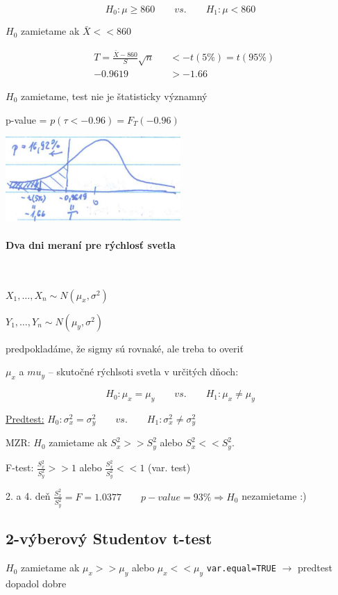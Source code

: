 \documentclass[unknownkeysallowed]{article}
\begin{document}
$$H_0: \mu \geq 860 \qquad vs. \qquad H_1:  \mu < 860$$

\begin{multicols}{2}
$H_0$ zamietame ak $\bar{X} << 860$

\begin{align*}
&T = \frac{\bar{X}-860}{S}\sqrt{n} &&< -t(5\%) = t(95\%)\\
&-0.9619 &&> -1.66
\end{align*}

$H_0$ zamietame, test nie je štatisticky významný

p-value = $p(\tau < -0.96) = F_T(-0.96)$

\columnbreak

\includegraphics[width=0.5\textwidth]{imgs/obr18.png}
\end{multicols}

\paragraph{Dva dni meraní pre rýchlosť svetla}~

$X_1, \ldots, X_n \sim N(\mu_x, \sigma^2)$

$Y_1, \ldots, Y_n \sim N(\mu_y, \sigma^2)$

predpokladáme, že sigmy sú rovnaké, ale treba to overiť

$\mu_x$ a $mu_y$ -- skutočné rýchlsoti svetla v určitých dňoch:

$$H_0: \mu_x = \mu_y \qquad vs. \qquad H_1:  \mu_x \neq \mu_y$$

\underline{Predtest:} $H_0: \sigma^2_x = \sigma^2_y \qquad vs. \qquad H_1:  \sigma^2_x \neq \sigma^2_y$

MZR: $H_0$ zamietame ak $S_x^2 >> S_y^2$ alebo $S_x^2 << S_y^2$.

F-test: $\frac{S_x^2}{S_y^2} >> 1$ alebo $\frac{S_x^2}{S_y^2} << 1$ (var. test)

2. a 4. deň $\frac{S_x^2}{S_y^2}=F=1.0377 \qquad p-value = 93\% \Rightarrow H_0$ nezamietame :)

\subsection*{2-výberový Studentov t-test}
$H_0$ zamietame ak $\mu_x >> \mu_y$ alebo $\mu_x << \mu_y$ \qquad \texttt{var.equal=TRUE} $\to$ predtest dopadol dobre
\end{document}
